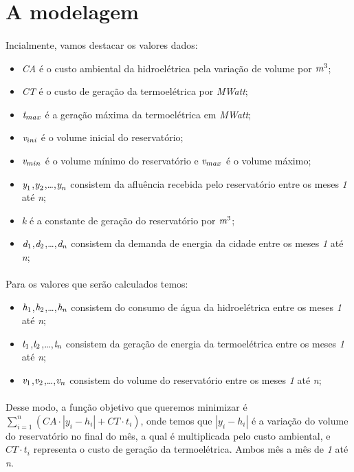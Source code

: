 \documentclass{article}
\begin{document}
\section{A modelagem}
\paragraph{} Incialmente, vamos destacar os valores dados:
\begin{itemize}
    \item \emph{CA} é o custo ambiental da hidroelétrica pela variação de volume por $\emph{m}^3$;
    \item \emph{CT} é o custo de geração da termoelétrica por \emph{MWatt};
    \item $\emph{t}_{max}$ é a geração máxima da termoelétrica em \emph{MWatt};
    \item $\emph{v}_{ini}$ é o volume inicial do reservatório;
    \item $\emph{v}_{min}$ é o volume mínimo do reservatório e $\emph{v}_{max}$ é o volume máximo;
    \item $\emph{y}_1$,$\emph{y}_2$,\dots,$\emph{y}_n$ consistem da afluência recebida pelo reservatório entre os meses \emph{1} até \emph{n};
    \item \emph{k} é a constante de geração do reservatório por $\emph{m}^3$;
    \item $\emph{d}_1$,$\emph{d}_2$,\dots,$\emph{d}_n$ consistem da demanda de energia da cidade entre os meses \emph{1} até \emph{n};
\end{itemize}
\paragraph{} Para os valores que serão calculados temos:
\begin{itemize}
    \item $\emph{h}_1$,$\emph{h}_2$,\dots,$\emph{h}_n$ consistem do consumo de água da hidroelétrica entre os meses \emph{1} até \emph{n};
    \item $\emph{t}_1$,$\emph{t}_2$,\dots,$\emph{t}_n$ consistem da geração de energia da termoelétrica entre os meses \emph{1} até \emph{n};
    \item $\emph{v}_1$,$\emph{v}_2$,\dots,$\emph{v}_n$ consistem do volume do reservatório entre os meses \emph{1} até \emph{n};
\end{itemize}
\paragraph{} Desse modo, a função objetivo que queremos minimizar é \emph{$\sum_{i=1}^{n} (CA \cdot | y_{i} - h_{i} | + CT \cdot t_{i})$}, onde temos que \emph{$|y_{i} - h_{i}|$} é a variação do volume do reservatório no final do mês, a qual é multiplicada pelo custo ambiental, e $CT \cdot t_{i}$ representa o custo de geração da termoelétrica. Ambos mês a mês de \emph{1} até \emph{n}.
\end{document}
